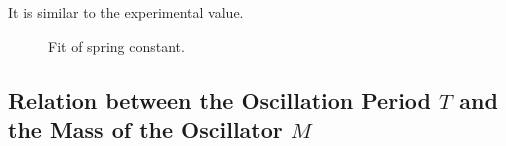 \documentclass{article}
\begin{document}
It is similar to the experimental value.



\begin{figure}[h!]
	\centering
	\caption{Fit of spring constant.}
	\label{fig-5}
\end{figure}

\newpage

\subsection{Relation between the Oscillation Period $T$ and the Mass of the Oscillator $M$}
\end{document}
